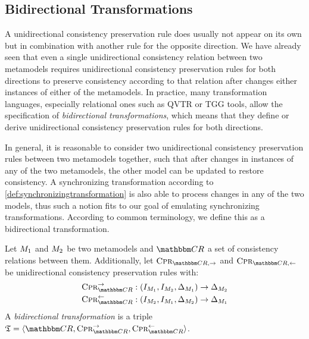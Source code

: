 \subsection{Bidirectional Transformations}

A unidirectional consistency preservation rule does usually not appear on its own but in combination with another rule for the opposite direction.
We have already seen that even a single unidirectional consistency relation between two metamodels requires unidirectional consistency preservation rules for both directions to preserve consistency according to that relation after changes either instances of either of the metamodels.
In practice, many transformation languages, especially relational ones such as \gls{QVTR} or \gls{TGG} tools, allow the specification of \emph{bidirectional transformations}, which means that they define or derive unidirectional consistency preservation rules for both directions.

In general, it is reasonable to consider two unidirectional consistency preservation rules between two metamodels together, such that after changes in instances of any of the two metamodels, the other model can be updated to restore consistency.
A synchronizing transformation according to \autoref{def:synchronizingtransformation} is also able to process changes in any of the two models, thus such a notion fits to our goal of emulating synchronizing transformations.
According to common terminology, we define this as a bidirectional transformation.

\begin{definition}
    \label{def:bidirectionaltransformation}
    Let $M_{1}$ and $M_{2}$ be two metamodels and $\consistencyrelationset{CR}$ a set of consistency relations between them.
    Additionally, let $\consistencypreservationrule{\consistencyrelationset{CR},{\rightarrow}}$ and $\consistencypreservationrule{\consistencyrelationset{CR},{\leftarrow}}$ be unidirectional consistency preservation rules with:
    \begin{align*}
        &
        \consistencypreservationrule{\consistencyrelationset{CR}}^{\rightarrow} : (\metamodelinstanceset{M}{1}, \metamodelinstanceset{M}{2}, \changeuniverse{\metamodel{M}{1}}) \rightarrow \changeuniverse{\metamodel{M}{2}} \\
        &
        \consistencypreservationrule{\consistencyrelationset{CR}}^{\leftarrow} : (\metamodelinstanceset{M}{2}, \metamodelinstanceset{M}{1}, \changeuniverse{\metamodel{M}{2}}) \rightarrow \changeuniverse{\metamodel{M}{1}}
    \end{align*}
    A \emph{bidirectional transformation} is a triple $\transformation{T} = \tupled{\consistencyrelationset{CR},\consistencypreservationrule{\consistencyrelationset{CR}}^{\rightarrow}, \consistencypreservationrule{\consistencyrelationset{CR}}^{\leftarrow}}$.
\end{definition}

